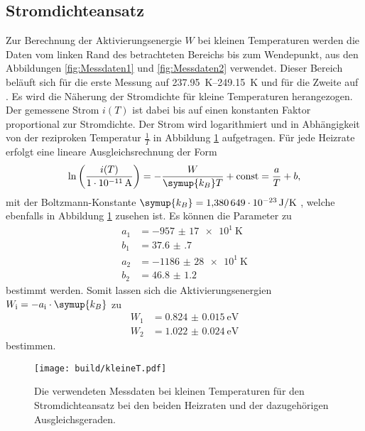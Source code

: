 \subsection{Stromdichteansatz}
\label{sec:klT}
Zur Berechnung der Aktivierungsenergie $W$ bei kleinen Temperaturen werden die Daten vom linken Rand des betrachteten Bereichs bis zum Wendepunkt, 
aus den Abbildungen \ref{fig:Messdaten1} und \ref{fig:Messdaten2} verwendet. Dieser Bereich beläuft sich für die erste Messung auf 
\SIrange{237.95}{249.15}{\kelvin} und für die Zweite auf . Es wird die Näherung der Stromdichte für kleine Temperaturen
herangezogen. Der gemessene Strom $i(T)$ ist dabei bis auf einen konstanten Faktor proportional zur Stromdichte. Der Strom wird logarithmiert
und in Abhängigkeit von der reziproken Temperatur $\frac{1}{T}$ in Abbildung \ref{fig:klT} aufgetragen. Für jede Heizrate erfolgt eine lineare Ausgleichsrechnung der Form
\begin{equation}
    \label{eqn:lin}
    \ln\left(\frac{i(T)}{\SI{1e-11}{\ampere}}\right) = -\frac{W}{\symup{k_B} T} + \text{const} = \frac{a}{T} + b,
\end{equation}
mit der Boltzmann-Konstante $\symup{k_B} = \SI{1.380649e-23}{\joule\per\kelvin}$ \cite{codata}, welche ebenfalls in Abbildung \ref{fig:klT} zusehen ist.
Es können die Parameter zu
\begin{align*}
    a_1 &= \SI{-957(17)e1}{\kelvin} \\
    b_1 &= \num{37.6(7)} \\
    a_2 &= \SI{-1186(28)e1}{\kelvin} \\
    b_2 &= \num{46.8(12)}
\end{align*}
bestimmt werden.
Somit lassen sich die Aktivierungsenergien $W_\text{i} = -a_\text{i} \cdot \symup{k_B}$ zu
\begin{align*}
    W_1 &= \SI{0.824(15)}{\electronvolt} \\
    W_2 &= \SI{1.022(24)}{\electronvolt}
\end{align*}
bestimmen.
\begin{figure}[htb]
  \centering
  \texttt{[image: build/kleineT.pdf]}
  \caption{Die verwendeten Messdaten bei kleinen Temperaturen für den Stromdichteansatz bei den beiden Heizraten und der dazugehörigen Ausgleichsgeraden.}
  \label{fig:klT}
\end{figure}
\FloatBarrier

